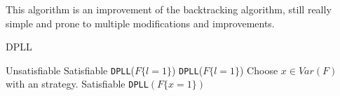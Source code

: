 This algorithm is an improvement of the backtracking algorithm, still really simple and prone to multiple modifications and improvements. 

\begin{algorithm}
  \caption{DPLL}\label{dpll}
  \begin{algorithmic}[1]
     \Return Unsatisfiable
    \EndIf
     \Return Satisfiable
    \EndIf
    \State
     \Return \texttt{DPLL}($F\{l=1\}$)
    \EndIf
     \Return \texttt{DPLL}($F\{l=1\}$)
  \EndIf
  \State
  \State Choose $x \in Var(F)$ with an strategy.
   \Return Satisfiable
  \EndIf
  \State \Return \texttt{DPLL}$(F\{x=1\})$
\end{algorithmic}
\end{algorithm}

